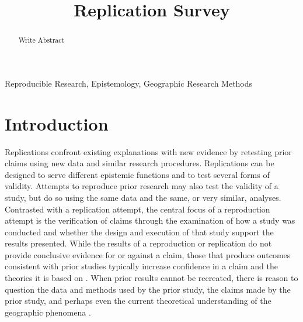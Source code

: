 \documentclass[]{interact}
\theoremstyle{plain}%
\theoremstyle{definition}
\theoremstyle{remark}
\begin{document}

\title{Replication Survey}

\author{
}

\maketitle

\begin{abstract}
Write Abstract

\end{abstract}

\begin{keywords}
Reproducible Research, Epistemology, Geographic Research Methods
\end{keywords}

\newpage
\section*{Introduction}
Replications confront existing explanations with new evidence by retesting prior claims using new data and similar research procedures.
Replications can be designed to serve different epistemic functions and to test several forms of validity.
Attempts to reproduce prior research may also test the validity of a study, but do so using the same data and the same, or very similar, analyses. 
Contrasted with a replication attempt, the central focus of a reproduction attempt is the verification of claims through the examination of how a study was conducted and whether the design and execution of that study support the results presented.
While the results of a reproduction or replication do not provide conclusive evidence for or against a claim, those that produce outcomes consistent with prior studies typically increase confidence in a claim and the theories it is based on \citep{earp2015, nichols2021}. 
When prior results cannot be recreated, there is reason to question the data and methods used by the prior study, the claims made by the prior study, and perhaps even the current theoretical understanding of the geographic phenomena \citep{christensen2019, NASEM2019}.
\end{document}
